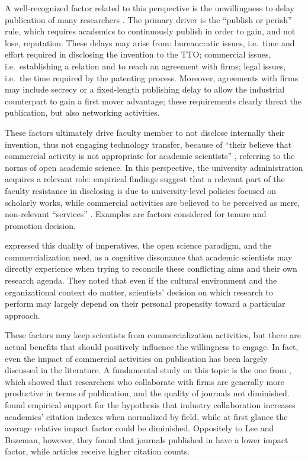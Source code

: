 A well-recognized factor related to this perspective is the unwillingness to delay publication of many researchers \citep{Thursby2002, OShea2004, Baldini2007}. The primary driver is the \enquote{publish or perish} rule, which requires academics to continuously publish in order to gain, and not lose, reputation. These delays may arise from: bureaucratic issues, i.e.\ time and effort required in disclosing the invention to the TTO; commercial issues, i.e.\ establishing a relation and to reach an agreement with firms; legal issues, i.e.\ the time required by the patenting process. Moreover, agreements with firms may include secrecy or a fixed-length publishing delay to allow the industrial counterpart to gain a first mover advantage; these requirements clearly threat the publication, but also networking activities. 

These factors ultimately drive faculty member to not disclose internally their invention, thus not engaging technology transfer, because of \enquote{their believe that commercial activity is not appropriate for academic scientists} \citep{Bercovitz2006}, referring to the norms of open academic science.  In this perspective, the university administration acquires a relevant role: empirical findings suggest that a relevant part of the faculty resistance in disclosing is due to university-level policies focused on scholarly works, while commercial activities are believed to be perceived as mere, non-relevant \enquote{services} \citep{Markman2005}. Examples are factors considered for tenure and promotion decision.

\citet{Muscio2013} expressed this duality of imperatives, the open science paradigm, and the commercialization need, as a cognitive dissonance that academic scientists may directly experience when trying to reconcile these conflicting aims and their own research agenda. They noted that even if the cultural environment and the organizational context do matter, scientists' decision on which research to perform may largely depend on their personal propensity toward a particular approach.

These factors may keep scientists from commercialization activities, but there are actual benefits that should positively influence the willingness to engage. In fact, even the impact of commercial activities on publication has been largely discussed in the literature. A fundamental study on this topic is the one from \citet{Lee2005}, which showed that researchers who collaborate with firms are generally more productive in terms of publication, and the quality of journals not diminished. \citet{Lebeau2008} found empirical support for the hypothesis that industry collaboration increases academics' citation indexes when normalized by field, while at first glance the average relative impact factor could be diminished. Oppositely to Lee and Bozeman, however, they found that journals published in have a lower impact factor, while articles receive higher citation counts.

